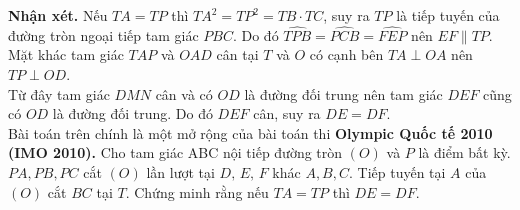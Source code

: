 \begin{bt}
{		\textbf{Nhận xét.}  Nếu $TA = TP$ thì $TA^2=TP^2=TB\cdot TC$, suy ra $TP$ là tiếp tuyến của đường tròn ngoại tiếp tam giác $PBC$. Do đó $\widehat{TPB}=\widehat{PCB}=\widehat{FEP}$ nên $EF \parallel TP$.\\
		Mặt khác tam giác $TAP$ và $OAD$ cân tại $T$ và $O$ có cạnh bên $TA\perp OA$  nên $TP\perp OD$.\\
		Từ đây tam giác $DMN$ cân và có $OD$ là đường đối trung nên tam giác $DEF$ cũng có $OD$ là đường đối trung. Do đó $DEF$ cân, suy ra $DE = DF$.\\
		Bài toán trên chính là một mở rộng của bài toán thi \textbf{Olympic Quốc tế 2010 (IMO 2010).}
		Cho tam giác ABC nội tiếp đường tròn $(O)$ và $P$ là điểm bất kỳ. $PA, PB, PC$ cắt $(O)$ lần lượt tại $D,\, E,\, F$ khác $A, B, C$. Tiếp tuyến tại $A$ của $(O)$ cắt $BC$ tại $T$. Chứng minh rằng nếu $TA = TP$ thì $DE = DF$.
	}
\end{bt}


